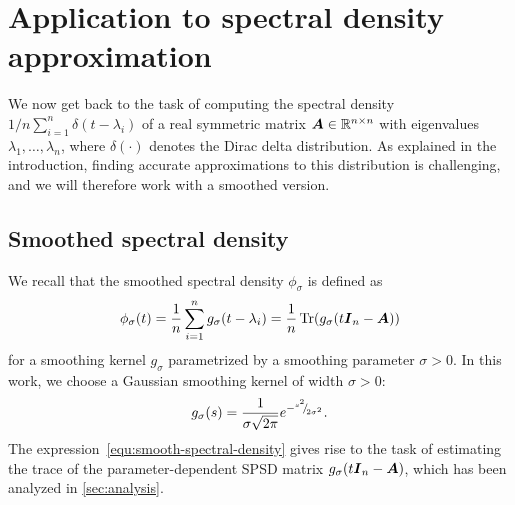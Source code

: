 
\section{Application to spectral density approximation}
\label{sec:application}

We now get back to the task of computing the spectral density $1/n \sum_{i=1}^{n} \delta(t - \lambda_i)$ of a real symmetric matrix $\boldsymbol{A} \in \mathbb{R}^{n \times n}$ with eigenvalues $\lambda_1, \dots, \lambda_n$, where $\delta(\cdot)$ denotes the Dirac delta distribution. As explained in the introduction, finding accurate approximations to this distribution is challenging, and we will therefore work with
a smoothed version.

\subsection{Smoothed spectral density}
\label{subsec:spectral-density}

We recall that the smoothed spectral density $\phi_{\sigma}$ is defined as
\begin{equation}
    \phi_{\sigma}(t) = \frac{1}{n} \sum_{i=1}^{n} g_{\sigma}(t - \lambda_i) = \frac{1}{n} \operatorname{Tr}(g_{\sigma}(t\boldsymbol{I}_n - \boldsymbol{A}))
    \label{equ:smooth-spectral-density}
\end{equation}
for a smoothing kernel $g_{\sigma}$ parametrized by a smoothing parameter $\sigma > 0$. In this work, we choose a Gaussian smoothing kernel of width $\sigma > 0$:
\begin{equation}
    g_{\sigma}(s) = \frac{1}{\sigma \sqrt{2\pi}} e^{-{}^{s^2}{\mskip -5mu/\mskip -3mu}_{2\sigma^2}}.
    \label{equ:smoothing-kernel}
\end{equation}
The expression~\cref{equ:smooth-spectral-density} gives rise to the task of estimating the trace of the parameter-dependent SPSD matrix $g_{\sigma}(t\boldsymbol{I}_n - \boldsymbol{A})$, which has been analyzed in \cref{sec:analysis}.

